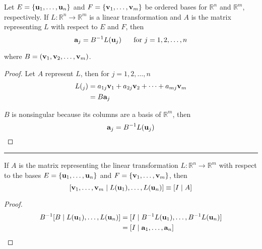 \begin{theorem}
	Let $E = \{ {\bf u}_1, \dots, {\bf u}_n \}$ and $F = \{ {\bf v}_1, \dots, {\bf v}_m \}$ be ordered bases for $\mathbb{R}^n$ and $\mathbb{R}^m$, respectively.  If $L: \mathbb{R}^n \to \mathbb{R}^m$ is a linear transformation and $A$ is the matrix representing $L$ with respect to $E$ and $F$, then 
	\[  {\bf a}_j =  B^{-1} L({\bf u}_j) \;\;\;\;\; \text{ for } j = 1, 2, \dots, n \]
	
where $B = ({\bf v}_1, {\bf v}_2, \dots, {\bf v}_m)$.
	
	\begin{proof}
		Let $A$ represent $L$, then for $j = 1, 2, \dots, n$
		\begin{align*}
			 L({\bf }_j) &= a_{1j} {\bf v}_1 + a_{2j} {\bf v}_2 + \cdots + a_{mj} {\bf v}_m\\
			 		&= B {\bf a}_j 		
		\end{align*}
		
		$B$ is nonsingular because its columns are a basis of $\mathbb{R}^m$, then 
	\[  {\bf a}_j = B^{-1} L({\bf u}_j) \]



	\end{proof}
		
\end{theorem}





\rule[0.01in]{\textwidth}{0.0025in}


\begin{corollary}
	If $A$ is the matrix representing the linear transformation $L: \mathbb{R}^n \to \mathbb{R}^m$ with respect to the bases  $E = \{ {\bf u}_1, \dots, {\bf u}_n \}$ and $F = \{ {\bf v}_1, \dots, {\bf v}_m \}$, then 
	\[  [ {\bf v}_1, \dots, {\bf v}_m \; | \; L({\bf u}_1), \dots, L({\bf u}_n) ]  \equiv [ I \; | \; A ] \] 
	
	
	\begin{proof}
	\begin{align*}
		B^{-1} [ B \; | \; L({\bf u}_1), \dots, L({\bf u}_n) ]  &= [ I  \; | \;   B^{-1} L({\bf u}_1), \dots, B^{-1} L({\bf u}_n) ]\\
		&=  [ I \;  | \;   {\bf a}_1, \dots, {\bf a}_n ]
		\end{align*}
	\end{proof}
	
	\end{corollary}


